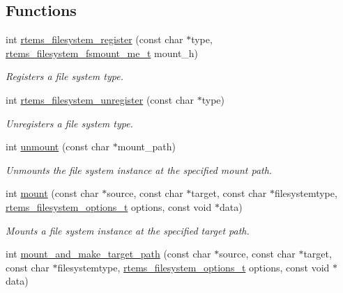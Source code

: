 \subsection*{Functions}
\begin{DoxyCompactItemize}
\item 
int \mbox{\hyperlink{group__FileSystemTypesAndMount_gaac7f1c7fe78f3acc145272809cef62a2}{rtems\+\_\+filesystem\+\_\+register}} (const char $\ast$type, \mbox{\hyperlink{group__LibIOFSOps_gab86f790d75005100fc4d847f7cdc8aef}{rtems\+\_\+filesystem\+\_\+fsmount\+\_\+me\+\_\+t}} mount\+\_\+h)
\begin{DoxyCompactList}\small\item\em Registers a file system {\itshape type}. \end{DoxyCompactList}\item 
int \mbox{\hyperlink{group__FileSystemTypesAndMount_ga4e658123f1059ea0684904df0ddb8d67}{rtems\+\_\+filesystem\+\_\+unregister}} (const char $\ast$type)
\begin{DoxyCompactList}\small\item\em Unregisters a file system {\itshape type}. \end{DoxyCompactList}\item 
int \mbox{\hyperlink{group__FileSystemTypesAndMount_ga4c8f87fc991f94992e0da1f87243f9e0}{unmount}} (const char $\ast$mount\+\_\+path)
\begin{DoxyCompactList}\small\item\em Unmounts the file system instance at the specified mount path. \end{DoxyCompactList}\item 
int \mbox{\hyperlink{group__FileSystemTypesAndMount_gaf3c1bed49bb0f3dec88d330b4f88d48b}{mount}} (const char $\ast$source, const char $\ast$target, const char $\ast$filesystemtype, \mbox{\hyperlink{group__FileSystemTypesAndMount_gabb3a23ee6b6e7aacb719a1a81716af7a}{rtems\+\_\+filesystem\+\_\+options\+\_\+t}} options, const void $\ast$data)
\begin{DoxyCompactList}\small\item\em Mounts a file system instance at the specified target path. \end{DoxyCompactList}\item 
int \mbox{\hyperlink{group__FileSystemTypesAndMount_ga27af6440b4ef795576c94e870c5d997f}{mount\+\_\+and\+\_\+make\+\_\+target\+\_\+path}} (const char $\ast$source, const char $\ast$target, const char $\ast$filesystemtype, \mbox{\hyperlink{group__FileSystemTypesAndMount_gabb3a23ee6b6e7aacb719a1a81716af7a}{rtems\+\_\+filesystem\+\_\+options\+\_\+t}} options, const void $\ast$data)

\end{DoxyCompactItemize}
